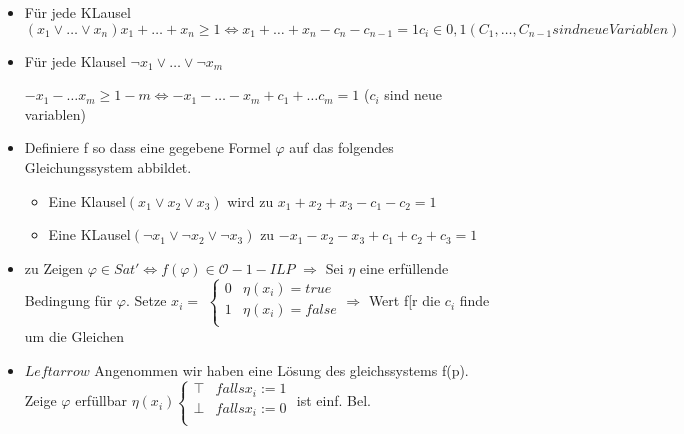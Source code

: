 \documentclass[12pt, oneside, a4paper, numbers=enddot, abstracton, parskip=full]{scrreprt}
\newcommand{\bigO}{\ensuremath{\mathcal{O}}}
\begin{document}
\begin{itemize}
\item Für jede KLausel
  \begin{math}
  (x_1 \vee \dots \vee x_n)
    x_1 + \dots + x_n \geq 1
    \Leftrightarrow
    x_1 + \dots + x_n - c_n - c_{n-1} = 1   c_i \in {0,1}
    (C_1, \dots , C_{n-1} sind neue Variablen)
   \end{math}
\item Für jede Klausel $\neg x_1 \vee \dots \vee \neg x_m$

  \begin{math}
    -x_1 - \dots x_m \geq 1 - m
    \Leftrightarrow -x_1 - \dots -x_m + c_1 + \dots c_m = 1
  \end{math} ($c_i$ sind neue variablen)

\item Definiere f so dass eine gegebene Formel $\varphi$ auf das folgendes
  Gleichungssystem abbildet.
  \begin{itemize}
  \item Eine Klausel$(x_1 \vee x_2 \vee x_3)$ wird zu
    $x_1 + x_2 + x_3 - c_1 - c_2 = 1$
  \item Eine KLausel$(\neg x_1 \vee \neg  x_2 \vee \neg x_3)$ zu
        $-x_1 -x_2 - x_3 + c_1 + c_2 + c_3= 1$
  \end{itemize}
\item zu Zeigen $\varphi \in Sat' \Leftrightarrow f(\varphi) \in \bigO -1 -ILP$
  $\Rightarrow$ Sei $\eta$ eine erfüllende Bedingung für $\varphi$.
  Setze $x_i =$
  \begin{math}
  \begin{cases}
    0 & \eta (x_i) = true \\
    1 & \eta (x_i) = false \\
  \end{cases}
  \Rightarrow
  \end{math}
  Wert f[r die $c_i$ finde um die Gleichen 
  \item $Leftarrow$ Angenommen wir haben eine Lösung des gleichssystems f(p). Zeige $\varphi$
    erfüllbar
    \begin{math}
      \eta (x_i)
      \begin{cases}
        \top & falls x_i := 1 \\
        \bot & falls x_i := 0 \\
      \end{cases}
    \end{math}
      ist einf. Bel.
\end{itemize}
\end{document}

